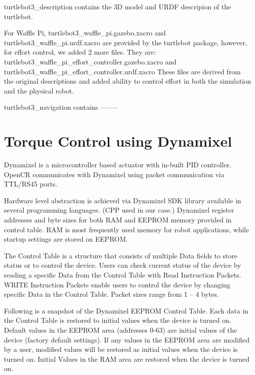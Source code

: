 \documentclass[12]{article}
\begin{document}
turtlebot3\_description contains the 3D model and URDF descripion of the turtlebot. 

For Waffle Pi, turtlebot3\_waffle\_pi.gazebo.xacro and turtlebot3\_waffle\_pi.urdf.xacro are provided by the turtlebot package, however, for effort control, we added 2 more files. 
They are: turtlebot3\_waffle\_pi\_effort\_controller.gazebo.xacro and turtlebot3\_waffle\_pi\_effort\_controller.urdf.xacro
These files are derived from the original descriptions and added ability to control effort in both the simulation and the physical robot. 

turtlebot3\_navigation contains --------
\section{Torque Control using Dynamixel}
       
Dynamixel is a microcontroller based actuator with in-built PID controller. OpenCR communicates with Dynamixel using packet communication via TTL/RS45 ports. 

Hardware level abstraction is achieved via Dynamixel SDK library available in several programming languages. (CPP used in our case.)
Dynamixel register addresses and byte sizes for both RAM and EEPROM memory provided in control table. RAM is most frequently used memory for robot applications, while startup settings are stored on EEPROM.

The Control Table is a structure that consists of multiple Data fields to store status or to control the device. Users can check current status of the device by reading a specific Data from the Control Table with Read Instruction Packets. WRITE Instruction Packets enable users to control the device by changing specific Data in the Control Table. Packet sizes range from 1 – 4 bytes.

Following is a snapshot of the Dynamixel EEPROM Control Table. Each data in the Control Table is restored to initial values when the device is turned on. Default values in the EEPROM area (addresses 0-63) are initial values of the device (factory default settings). If any values in the EEPROM area are modified by a user, modified values will be restored as initial values when the device is turned on. Initial Values in the RAM area are restored when the device is turned on.
\end{document}
